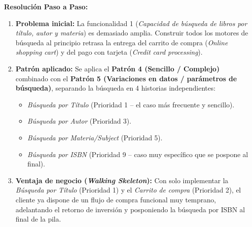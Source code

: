 \begin{ejercicio}
\textbf{Resolución Paso a Paso:}
\begin{enumerate}[label=\textbf{\arabic*.}, itemsep=3pt]
    \item \textbf{Problema inicial:} La funcionalidad 1 (\textit{Capacidad de búsqueda de libros por título, autor y materia}) es demasiado amplia. Construir todos los motores de búsqueda al principio retrasa la entrega del carrito de compra (\textit{Online shopping cart}) y del pago con tarjeta (\textit{Credit card processing}).
    \item \textbf{Patrón aplicado:} Se aplica el \textbf{Patrón 4 (Sencillo / Complejo)} combinado con el \textbf{Patrón 5 (Variaciones en datos / parámetros de búsqueda)}, separando la búsqueda en 4 historias independientes:
    \begin{itemize}
        \item \textit{Búsqueda por Título} (Prioridad 1 -- el caso más frecuente y sencillo).
        \item \textit{Búsqueda por Autor} (Prioridad 3).
        \item \textit{Búsqueda por Materia/Subject} (Prioridad 5).
        \item \textit{Búsqueda por ISBN} (Prioridad 9 -- caso muy específico que se pospone al final).
    \end{itemize}
    \item \textbf{Ventaja de negocio (\textit{Walking Skeleton}):} Con solo implementar la \textit{Búsqueda por Título} (Prioridad 1) y el \textit{Carrito de compra} (Prioridad 2), el cliente ya dispone de un flujo de compra funcional muy temprano, adelantando el retorno de inversión y posponiendo la búsqueda por ISBN al final de la pila.
\end{enumerate}
\end{ejercicio}

